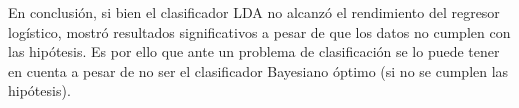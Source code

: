 \documentclass[11pt]{article}
\begin{document}
En conclusión, si bien el clasificador LDA no alcanzó el rendimiento del
regresor logístico, mostró resultados significativos a pesar de que los
datos no cumplen con las hipótesis. Es por ello que ante un problema de
clasificación se lo puede tener en cuenta a pesar de no ser el
clasificador Bayesiano óptimo (si no se cumplen las hipótesis).


    
    
    
    
\end{document}
